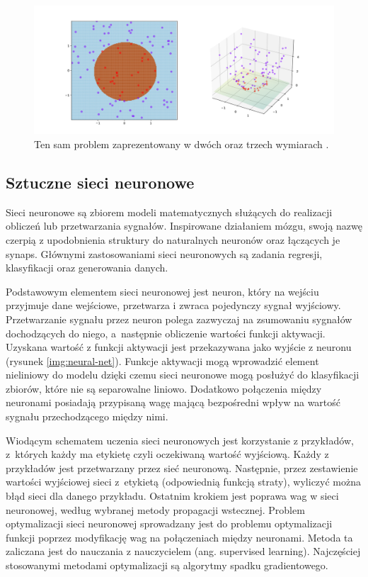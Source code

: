 \documentclass[a4paper, twoside, 11pt, openright]{article}
\begin{document}
\begin{figure}[H]
\centering \includegraphics[scale=0.2]{img/svm2.png}
\caption{Ten sam problem zaprezentowany w dwóch oraz trzech wymiarach \cite{wikisvm}.}
\label{img:wiki_svm2}
\end{figure}


\subsection{Sztuczne sieci neuronowe}

Sieci neuronowe \cite{neural-nets} są zbiorem modeli matematycznych służących do realizacji obliczeń lub przetwarzania sygnałów. Inspirowane działaniem mózgu, swoją nazwę czerpią z upodobnienia struktury do naturalnych neuronów oraz łączących je synaps. Głównymi zastosowaniami sieci neuronowych są zadania regresji, klasyfikacji oraz generowania danych. 

\bigskip

Podstawowym elementem sieci neuronowej jest neuron, który na wejściu przyjmuje dane wejściowe, przetwarza i zwraca pojedynczy sygnał wyjściowy. Przetwarzanie sygnału przez neuron polega zazwyczaj na zsumowaniu sygnałów dochodzących do niego, a~następnie obliczenie wartości funkcji aktywacji. Uzyskana wartość z funkcji aktywacji jest przekazywana jako wyjście z neuronu (rysunek \ref{img:neural-net}). Funkcje aktywacji mogą wprowadzić element nieliniowy do modelu dzięki czemu sieci neuronowe mogą posłużyć do klasyfikacji zbiorów, które nie są separowalne liniowo. Dodatkowo połączenia między neuronami posiadają przypisaną wagę mającą bezpośredni wpływ na wartość sygnału przechodzącego między nimi.

\bigskip

Wiodącym schematem uczenia sieci neuronowych jest korzystanie z przykładów, z~których każdy ma etykietę czyli oczekiwaną wartość wyjściową. Każdy z przykładów jest przetwarzany przez sieć neuronową. Następnie, przez zestawienie wartości wyjściowej sieci z~etykietą (odpowiednią funkcją straty), wyliczyć można błąd sieci dla danego przykładu. Ostatnim krokiem jest poprawa wag w sieci neuronowej, według wybranej metody propagacji wstecznej. Problem optymalizacji sieci neuronowej sprowadzany jest do problemu optymalizacji funkcji poprzez modyfikację wag na połączeniach między neuronami. Metoda ta zaliczana jest do nauczania z nauczycielem (ang. supervised learning). Najczęściej stosowanymi metodami optymalizacji są algorytmy spadku gradientowego. 
\end{document}
